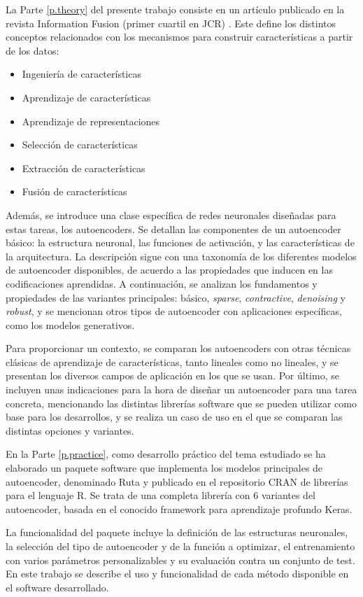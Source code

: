 \documentclass[oneside,openright,titlepage,numbers=noenddot,openany,headinclude,footinclude=true,
cleardoublepage=empty,abstractoff,BCOR=5mm,paper=a4,fontsize=12pt,main=spanish]{scrreprt}
\begin{document}
La Parte \ref{p.theory} del presente trabajo consiste en un artículo publicado en la revista Information Fusion (primer cuartil en JCR) \cite{charte2017}. Este define los distintos conceptos relacionados con los mecanismos para construir características a partir de los datos:
\begin{itemize}
\item Ingeniería de características
\item Aprendizaje de características
\item Aprendizaje de representaciones
\item Selección de características
\item Extracción de características
\item Fusión de características
\end{itemize}
Además, se introduce una clase específica de redes neuronales diseñadas para estas tareas, los autoencoders. Se detallan las componentes de un autoencoder básico: la estructura neuronal, las funciones de activación, y las características de la arquitectura. La descripción sigue con una taxonomía de los diferentes modelos de autoencoder disponibles, de acuerdo a las propiedades que inducen en las codificaciones aprendidas. A continuación, se analizan los fundamentos y propiedades de las variantes principales: básico, \textit{sparse}, \textit{contractive}, \textit{denoising} y \textit{robust}, y se mencionan otros tipos de autoencoder con aplicaciones específicas, como los modelos generativos.

Para proporcionar un contexto, se comparan los autoencoders con otras técnicas clásicas de aprendizaje de características, tanto lineales como no lineales, y se presentan los diversos campos de aplicación en los que se usan. Por último, se incluyen unas indicaciones para la hora de diseñar un autoencoder para una tarea concreta, mencionando las distintas librerías software que se pueden utilizar como base para los desarrollos, y se realiza un caso de uso en el que se comparan las distintas opciones y variantes.

En la Parte \ref{p.practice}, como desarrollo práctico del tema estudiado se ha elaborado un paquete software que implementa los modelos principales de autoencoder, denominado Ruta y publicado en el repositorio CRAN de librerías para el lenguaje R. Se trata de una completa librería con 6 variantes del autoencoder, basada en el conocido framework para aprendizaje profundo Keras.

La funcionalidad del paquete incluye la definición de las estructuras neuronales, la selección del tipo de autoencoder y de la función a optimizar, el entrenamiento con varios parámetros personalizables y su evaluación contra un conjunto de test. En este trabajo se describe el uso y funcionalidad de cada método disponible en el software desarrollado.
\end{document}
